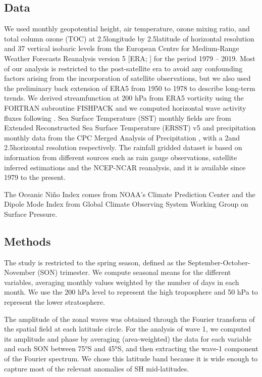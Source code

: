 \documentclass[pdflatex,sn-basic]{sn-jnl}
\theoremstyle{thmstyleone}%
\theoremstyle{thmstyletwo}%
\theoremstyle{thmstylethree}%
\begin{document}
\hypertarget{data}{%
\subsection{Data}\label{data}}

We used monthly geopotential height, air temperature, ozone mixing ratio, and total column ozone (TOC) at 2.5\degree longitude by 2.5\degree latitude of horizontal resolution and 37 vertical isobaric levels from the European Centre for Medium-Range Weather Forecasts Reanalysis version 5 {[}ERA; \citet{era5}{]} for the period 1979 -- 2019.
Most of our analysis is restricted to the post-satellite era to avoid any confounding factors arising from the incorporation of satellite observations, but we also used the preliminary back extension of ERA5 from 1950 to 1978 \citep{era5be} to describe long-term trends.
We derived streamfunction at 200 hPa from ERA5 vorticity using the FORTRAN subroutine FISHPACK \citep{fishpack} and we computed horizontal wave activity fluxes following \citet{plumb1985}.
Sea Surface Temperature (SST) monthly fields are from Extended Reconstructed Sea Surface Temperature (ERSST) v5 \citep{huang2017} and precipitation monthly data from the CPC Merged Analysis of Precipitation \citep{cmap}, with a 2\degree and 2.5\degree horizontal resolution respectively.
The rainfall gridded dataset is based on information from different sources such as rain gauge observations, satellite inferred estimations and the NCEP-NCAR reanalysis, and it is available since 1979 to the present.

The Oceanic Niño Index \citep[ONI,][]{bamston1997} comes from NOAA's Climate Prediction Center and the Dipole Mode Index \citep[DMI,][]{saji2003} from Global Climate Observing System Working Group on Surface Pressure.

\hypertarget{methods-1}{%
\subsection{Methods}\label{methods-1}}

The study is restricted to the spring season, defined as the September-October-November (SON) trimester.
We compute seasonal means for the different variables, averaging monthly values weighted by the number of days in each month.
We use the 200 hPa level to represent the high troposphere and 50 hPa to represent the lower stratosphere.

The amplitude of the zonal waves was obtained through the Fourier transform of the spatial field at each latitude circle.
For the analysis of wave 1, we computed its amplitude and phase by averaging (area-weighted) the data for each variable and each SON between 75°S and 45°S, and then extracting the wave-1 component of the Fourier spectrum.
We chose this latitude band because it is wide enough to capture most of the relevant anomalies of SH mid-latitudes.
\end{document}
